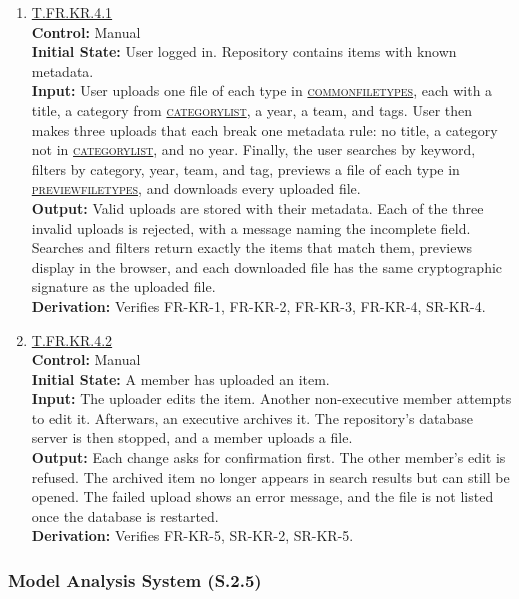 \documentclass[12pt, titlepage]{article}
\newcommand{\testdef}[1]{\leavevmode\hypertarget{test:#1}{}\hyperlink{trace:#1}{#1}}
\DeclareRobustCommand{\cname}[1]{{\renewcommand{\_}{\textunderscore\allowbreak}\textsc{#1}}}
\newcommand{\constfirst}[1]{\leavevmode\hypertarget{constfirst:\detokenize{#1}}{}\hyperlink{const:\detokenize{#1}}{\cname{#1}}}
\newcommand{\const}[1]{\hyperlink{const:\detokenize{#1}}{\cname{#1}}}
\begin{document}
\begin{enumerate}

\item \testdef{T.FR.KR.4.1}\\
\textbf{Control:} Manual\\
\textbf{Initial State:} User logged in. Repository contains items with known
metadata.\\
\textbf{Input:} User uploads one file of each type in \constfirst{common\_file\_types},
each with a title, a category from \constfirst{category\_list}, a year, a team, and
tags. User then makes three uploads that each break one metadata rule: no title,
a category not in \const{category\_list}, and no year. Finally, the user searches
by keyword, filters by category, year, team, and tag, previews a file of each
type in \constfirst{preview\_file\_types}, and downloads every uploaded file.\\
\textbf{Output:} Valid uploads are stored with their metadata. Each of the three
invalid uploads is rejected, with a message naming the incomplete field. Searches and
filters return exactly the items that match them, previews display in the
browser, and each downloaded file has the same cryptographic signature as the uploaded
file.\\
\textbf{Derivation:} Verifies FR-KR-1, FR-KR-2, FR-KR-3, FR-KR-4, SR-KR-4.

\item \testdef{T.FR.KR.4.2}\\
\textbf{Control:} Manual\\
\textbf{Initial State:} A member has uploaded an item.\\
\textbf{Input:} The uploader edits the item. Another non-executive member attempts to edit it.
Afterwars, an executive archives it. The repository's database server is then stopped,
and a member uploads a file.\\
\textbf{Output:} Each change asks for confirmation first. The other member's
edit is refused. The archived item no longer appears in search results but can
still be opened. The failed upload shows an error message, and the file is not
listed once the database is restarted.\\
\textbf{Derivation:} Verifies FR-KR-5, SR-KR-2, SR-KR-5.

\end{enumerate}

\subsubsection{Model Analysis System (S.2.5)}
\end{document}

